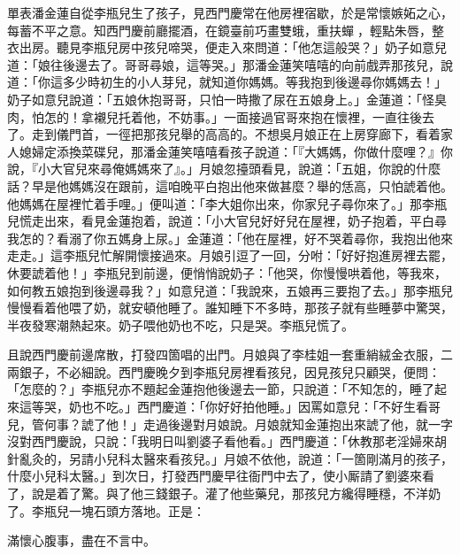 單表潘金蓮自從李瓶兒生了孩子，見西門慶常在他房裡宿歇，於是常懷嫉妬之心，每蓄不平之意。知西門慶前廳擺酒，在鏡臺前巧畫雙蛾，重扶蟬𩬆，輕點朱唇，整衣出房。聽見李瓶兒房中孩兒啼哭，便走入來問道：「他怎這般哭？」奶子如意兒道：「娘往後邊去了。哥哥尋娘，這等哭。」那潘金蓮笑嘻嘻的向前戲弄那孩兒，說道：「你這多少時初生的小人芽兒，就知道你媽媽。等我抱到後邊尋你媽媽去！」奶子如意兒說道：「五娘休抱哥哥，只怕一時撒了尿在五娘身上。」金蓮道：「怪臭肉，怕怎的！拿襯兒托着他，不妨事。」一面接過官哥來抱在懷裡，一直往後去了。走到儀門首，一徑把那孩兒舉的高高的。不想吳月娘正在上房穿廊下，看着家人媳婦定添換菜碟兒，那潘金蓮笑嘻嘻看孩子說道：「『大媽媽，你做什麼哩？』你說，『小大官兒來尋俺媽媽來了』。」{}月娘忽擡頭看見，說道：「五姐，你說的什麼話？早是他媽媽沒在跟前，這咱晚平白抱出他來做甚麼？舉的恁高，只怕諕着他。他媽媽在屋裡忙着手哩。」便叫道：「李大姐你出來，你家兒子尋你來了。」那李瓶兒慌走出來，看見金蓮抱着，說道：「小大官兒好好兒在屋裡，奶子抱着，平白尋我怎的？看溺了你五媽身上尿。」金蓮道：「他在屋裡，好不哭着尋你，我抱出他來走走。」這李瓶兒忙解開懷接過來。月娘引逗了一回，分咐：「好好抱進房裡去罷，休要諕着他！」李瓶兒到前邊，便悄悄說奶子：「他哭，你慢慢哄着他，等我來，如何教五娘抱到後邊尋我？」如意兒道：「我說來，五娘再三要抱了去。」那李瓶兒慢慢看着他喂了奶，就安頓他睡了。誰知睡下不多時，那孩子就有些睡夢中驚哭，半夜發寒潮熱起來。奶子喂他奶也不吃，只是哭。李瓶兒慌了。

且說西門慶前邊席散，打發四箇唱的出門。月娘與了李桂姐一套重綃絨金衣服，二兩銀子，不必細說。西門慶晚夕到李瓶兒房裡看孩兒，因見孩兒只顧哭，便問：「怎麼的？」李瓶兒亦不題起金蓮抱他後邊去一節，只說道：「不知怎的，睡了起來這等哭，奶也不吃。」西門慶道：「你好好拍他睡。」因罵如意兒：「不好生看哥兒，管何事？諕了他！」走過後邊對月娘說。月娘就知金蓮抱出來諕了他，就一字沒對西門慶說，只說：「我明日叫劉婆子看他看。」西門慶道：「休教那老淫婦來胡針亂灸的，另請小兒科太醫來看孩兒。」月娘不依他，說道：「一箇剛滿月的孩子，什麼小兒科太醫。」到次日，打發西門慶早往衙門中去了，使小厮請了劉婆來看了，說是着了驚。與了他三錢銀子。灌了他些藥兒，那孩兒方纔得睡穩，不洋奶了。李瓶兒一塊石頭方落地。正是：

\begin{myquote}
滿懷心腹事，盡在不言中。
\end{myquote}

